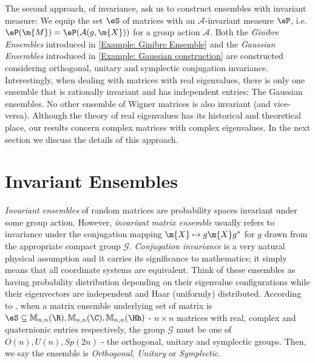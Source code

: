 The second approach, of invariance, ask us to construct ensembles with invariant measure: We equip the set $\eS$ of matrices with an $\mathcal{A}$-invariant measure $\eP$, i.e. $\eP(\m{M}) = \eP(\mathcal{A}(g, \m{X}))$ for a group action $\mathcal{A}$. Both the \textit{Ginibre Ensembles} introduced in \autoref{Example: Ginibre Ensemble} and the \textit{Gaussian Ensembles} introduced in \autoref{Example: Gaussian construction} are constructed considering orthogonal, unitary and symplectic conjugation invariance. Interestingly, when dealing with matrices with real eigenvalues, there is only one ensemble that is rationally invariant and has independent entries: The Gaussian ensembles. No other ensemble of Wigner matrices is also invariant (and vice-versa). Although the theory of real eigenvalues has its historical and theoretical place, our results concern complex matrices with complex eigenvalues. In the next section we discuss the details of this approach.


\section{Invariant Ensembles}
\label{Section: Invariant Ensembles}

\textit{Invariant ensembles} of random matrices are probability spaces invariant under some group action. However, \textit{invariant matrix ensemble} usually refers to invariance under the conjugation mapping $\m{X} \mapsto g\m{X}g^{*}$ for $g$ drawn from the appropriate compact group $\mathcal{G}$. \textit{Conjugation invariance} is a very natural physical assumption and it carries its significance to mathematics; it simply means that all coordinate systems are equivalent. Think of these ensembles as having probability distribution depending on their eigenvalue configurations while their eigenvectors are independent and Haar (uniformly) distributed. According to , when a matrix ensemble underlying set of matrix is $\eS \subseteq \mathbb{M}_{n,n}(\R), \mathbb{M}_{n,n}(\C), \mathbb{M}_{n,n}(\Hh)$ - $n \times n$ matrices with real, complex and quaternionic entries respectively, the group $\mathcal{G}$ must be one of $O(n), U(n), Sp(2n)$ - the orthogonal, unitary and symplectic groups. Then, we say the ensemble is \textit{Orthogonal}, \textit{Unitary} or \textit{Symplectic}. 

